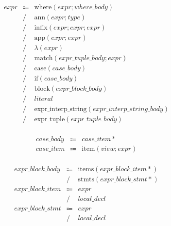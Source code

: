 \begin{align*}
    \begin{array}{rcll}
        \mathit{expr}
        &\Coloneq &\mathrm{where}(\mathit{expr}; \mathit{where\_body}) \\
        &\mathrel{/} &\mathrm{ann}(\mathit{expr}; \mathit{type}) \\
        &\mathrel{/} &\mathrm{infix}(\mathit{expr}; \mathit{expr}; \mathit{expr}) \\
        &\mathrel{/} &\mathrm{app}(\mathit{expr}; \mathit{expr}) \\
        &\mathrel{/} &\lambda(\mathit{expr}) \\
        &\mathrel{/} &\mathrm{match}(\mathit{expr\_tuple\_body}; \mathit{expr}) \\
        &\mathrel{/} &\mathrm{case}(\mathit{case\_body}) \\
        &\mathrel{/} &\mathrm{if}(\mathit{case\_body}) \\
        &\mathrel{/} &\mathrm{block}(\mathit{expr\_block\_body}) \\
        &\mathrel{/} &\mathit{literal} \\
        &\mathrel{/} &\mathrm{expr\_interp\_string}(\mathit{expr\_interp\_string\_body}) \\
        &\mathrel{/} &\mathrm{expr\_tuple}(\mathit{expr\_tuple\_body})
    \end{array}
\end{align*}

\begin{align*}
    \begin{array}{rcll}
        \mathit{case\_body}
        &\Coloneq &\mathit{case\_item}{*} \\
        \mathit{case\_item}
        &\Coloneq &\mathrm{item}(\mathit{view}; \mathit{expr})
    \end{array}
\end{align*}

\begin{align*}
    \begin{array}{rcll}
        \mathit{expr\_block\_body}
        &\Coloneq &\mathrm{items}(\mathit{expr\_block\_item}{*}) \\
        &\mathrel{/} &\mathrm{stmts}(\mathit{expr\_block\_stmt}{*}) \\
        \mathit{expr\_block\_item}
        &\Coloneq &\mathit{expr} \\
        &\mathrel{/} &\mathit{local\_decl} \\
        \mathit{expr\_block\_stmt}
        &\Coloneq &\mathit{expr} \\
        &\mathrel{/} &\mathit{local\_decl}
    \end{array}
\end{align*}
